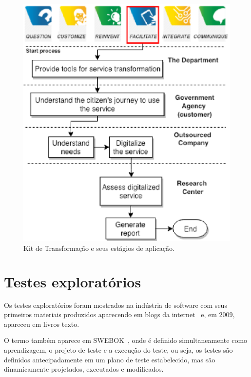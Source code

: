 \begin{figure}[h]
    \centering
    \includegraphics{figuras/kitTransformacao.eps}
    \caption[Referencial Teórico]{Kit de Transformação e seus estágios de aplicação.}
    \label{img:kitTransformacao}
\end{figure}



\section{Testes exploratórios}

Os testes exploratórios foram mostrados na indústria de software com seus primeiros materiais produzidos 
aparecendo em blogs da internet~\cite{kaner2000testing} e, em 2009, apareceu em livros texto. 

O termo também aparece em SWEBOK~\cite{bourque2014guide}, onde é definido simultaneamente como aprendizagem, o projeto de teste 
e a execução do teste, ou seja, os testes são definidos antecipadamente em um plano de teste estabelecido, mas 
são dinamicamente projetados, executados e modificados.

